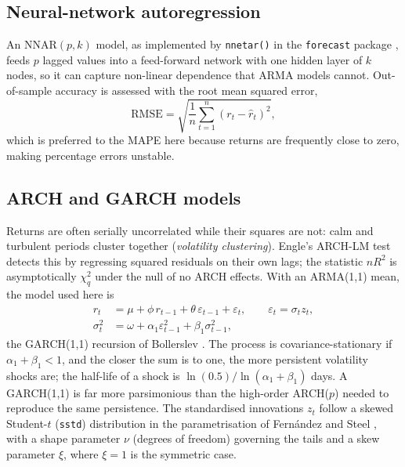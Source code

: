 \documentclass[11pt,a4paper]{article}
\begin{document}
\subsection{Neural-network autoregression}
An $\mathrm{NNAR}(p,k)$ model, as implemented by \texttt{nnetar()} in the \texttt{forecast} package \cite{hyndman2021}, feeds $p$ lagged values into a feed-forward network with one hidden layer of $k$ nodes, so it can capture non-linear dependence that ARMA models cannot. Out-of-sample accuracy is assessed with the root mean squared error,
\begin{equation}
  \mathrm{RMSE}=\sqrt{\frac{1}{n}\sum_{t=1}^{n}\left(r_t-\hat r_t\right)^2},
\end{equation}
which is preferred to the MAPE here because returns are frequently close to zero, making percentage errors unstable.

\subsection{ARCH and GARCH models}
Returns are often serially uncorrelated while their squares are not: calm and turbulent periods cluster together (\emph{volatility clustering}). Engle's ARCH-LM test \cite{engle1982} detects this by regressing squared residuals on their own lags; the statistic $nR^2$ is asymptotically $\chi^2_q$ under the null of no ARCH effects. With an ARMA(1,1) mean, the model used here is
\begin{align}
  r_t &= \mu + \phi\, r_{t-1} + \theta\, \varepsilon_{t-1} + \varepsilon_t, \qquad \varepsilon_t = \sigma_t z_t, \\
  \sigma_t^2 &= \omega + \alpha_1 \varepsilon_{t-1}^2 + \beta_1 \sigma_{t-1}^2 ,
\end{align}
the GARCH(1,1) recursion of Bollerslev \cite{bollerslev1986}. The process is covariance-stationary if $\alpha_1+\beta_1<1$, and the closer the sum is to one, the more persistent volatility shocks are; the half-life of a shock is $\ln(0.5)/\ln(\alpha_1+\beta_1)$ days. A GARCH(1,1) is far more parsimonious than the high-order ARCH($p$) needed to reproduce the same persistence. The standardised innovations $z_t$ follow a skewed Student-$t$ (\texttt{sstd}) distribution in the parametrisation of Fern\'andez and Steel \cite{fernandez1998}, with a shape parameter $\nu$ (degrees of freedom) governing the tails and a skew parameter $\xi$, where $\xi=1$ is the symmetric case.
\end{document}
